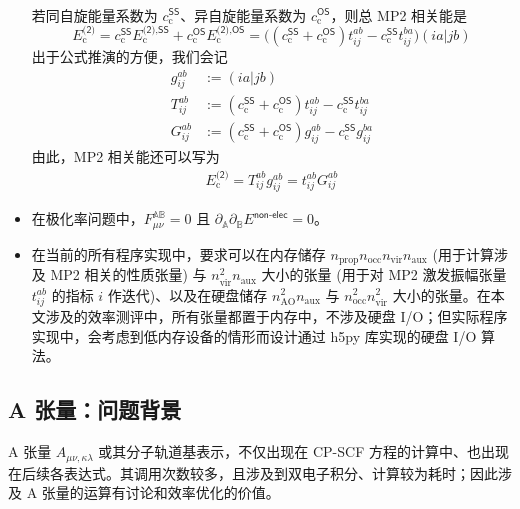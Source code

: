 \begin{itemize}[nosep]
\begin{align}
        \end{align}
        若同自旋能量系数为 $c_\mathrm{c}^\textsf{SS}$、异自旋能量系数为 $c_\mathrm{c}^\textsf{OS}$，则总 MP2 相关能是
        \begin{equation}
          E_\mathrm{c}^{\textsf{(2)}} = c_\mathrm{c}^\textsf{SS} E_\mathrm{c}^{\textsf{(2)}, \textsf{SS}} + c_\mathrm{c}^\textsf{OS} E_\mathrm{c}^{\textsf{(2)}, \textsf{OS}} = \big( (c_\mathrm{c}^\textsf{SS} + c_\mathrm{c}^\textsf{OS}) t_{ij}^{ab} - c_\mathrm{c}^\textsf{SS} t_{ij}^{ba} \big) (ia|jb)
        \end{equation}
        出于公式推演的方便，我们会记
        \begin{align}
          g_{ij}^{ab} &:= (ia|jb) \\
          T_{ij}^{ab} &:= (c_\mathrm{c}^\textsf{SS} + c_\mathrm{c}^\textsf{OS}) t_{ij}^{ab} - c_\mathrm{c}^\textsf{SS} t_{ij}^{ba} \\
          G_{ij}^{ab} &:= (c_\mathrm{c}^\textsf{SS} + c_\mathrm{c}^\textsf{OS}) g_{ij}^{ab} - c_\mathrm{c}^\textsf{SS} g_{ij}^{ba}
        \end{align}
        由此，MP2 相关能还可以写为
        \begin{align}
          E_\mathrm{c}^\textsf{(2)} = T_{ij}^{ab} g_{ij}^{ab} = t_{ij}^{ab} G_{ij}^{ab}
        \end{align}
  \item 在极化率问题中，$F_{\mu \nu}^{\mathbb{AB}} = 0$ 且 $\partial_{\mathbb{A}} \partial_{\mathbb{B}} E^\textsf{non-elec} = 0$。
  \item 在当前的所有程序实现中，要求可以在内存储存 $n_\mathrm{prop} n_\mathrm{occ} n_\mathrm{vir} n_\mathrm{aux}$ (用于计算涉及 MP2 相关的性质张量) 与 $n_\mathrm{vir}^2 n_\mathrm{aux}$ 大小的张量 (用于对 MP2 激发振幅张量 $t_{ij}^{ab}$ 的指标 $i$ 作迭代)、以及在硬盘储存 $n_\mathrm{AO}^2 n_\mathrm{aux}$ 与 $n_\mathrm{occ}^2 n_\mathrm{vir}^2$ 大小的张量。在本文涉及的效率测评中，所有张量都置于内存中，不涉及硬盘 I/O；但实际程序实现中，会考虑到低内存设备的情形而设计通过 h5py 库实现的硬盘 I/O 算法。
\end{itemize}

\subsection{A 张量：问题背景}

A 张量 $A_{\mu \nu, \kappa \lambda}$ 或其分子轨道基表示，不仅出现在 CP-SCF 方程的计算中、也出现在后续各表达式。其调用次数较多，且涉及到双电子积分、计算较为耗时；因此涉及 A 张量的运算有讨论和效率优化的价值。

